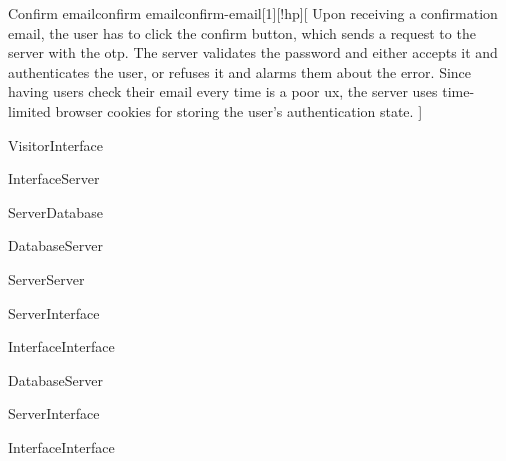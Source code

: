 \begin{sdfig}{Confirm email}{confirm email}{confirm-email}[1][!hp][
    Upon receiving a confirmation email, the user has to click the confirm button, which sends a request to the server with the \acrshort{otp}.
    The server validates the password and either accepts it and authenticates the user, or refuses it and alarms them about the error.
    Since having users check their email every time is a poor \acrfull{ux}, the server uses time-limited browser cookies for storing the user's authentication state.
  ]

  \begin{umlcall}[op={Confirm}]{Visitor}{Interface}
    \begin{umlcall}[op={Confirm}]{Interface}{Server}
      \begin{umlcall}[op={Has OTP}]{Server}{Database}
        \begin{umlfragment}[type=alt, label=true]
          \begin{umlcall}[type=return,op={Yes}]{Database}{Server}
            \begin{umlcall}[op={Add cookies}]{Server}{Server}
              \begin{umlcall}[type=return,op={Ok}]{Server}{Interface}
                \begin{umlcall}[op={Redirect to home}]{Interface}{Interface}
                \end{umlcall}
              \end{umlcall}
            \end{umlcall}
          \end{umlcall}
          \umlfpart[else]
          \begin{umlcall}[type=return,op={No}]{Database}{Server}
            \begin{umlcall}[type=return,op={Error}]{Server}{Interface}
              \begin{umlcall}[op={Show error}]{Interface}{Interface}
              \end{umlcall}
            \end{umlcall}
          \end{umlcall}
        \end{umlfragment}
      \end{umlcall}
    \end{umlcall}
  \end{umlcall}
\end{sdfig}

